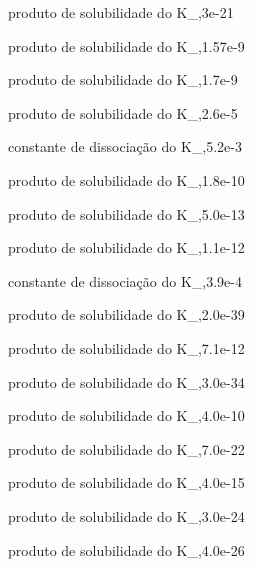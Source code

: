 %                                              
%                                              

{produto de solubilidade do }{K_{,}}{3e-21}{}

{produto de solubilidade do }{K_{,}}{1.57e-9}{}

{produto de solubilidade do }{K_{,}}{1.7e-9}{}


{produto de solubilidade do }{K_{,}}{2.6e-5}{}

{constante de dissociação do }{K_{,}}{5.2e-3}{}

{produto de solubilidade do }{K_{,}}{1.8e-10}{}

{produto de solubilidade do }{K_{,}}{5.0e-13}{}


{produto de solubilidade do }{K_{,}}{1.1e-12}{}


{constante de dissociação do }{K_{,}}{3.9e-4}{}


{produto de solubilidade do }{K_{,}}{2.0e-39}{}

{produto de solubilidade do }{K_{,}}{7.1e-12}{}

{produto de solubilidade do }{K_{,}}{3.0e-34}{}


{produto de solubilidade do }{K_{,}}{4.0e-10}{}

{produto de solubilidade do }{K_{,}}{7.0e-22}{}

{produto de solubilidade do }{K_{,}}{4.0e-15}{}

{produto de solubilidade do }{K_{,}}{3.0e-24}{}

{produto de solubilidade do }{K_{,}}{4.0e-26}{}

